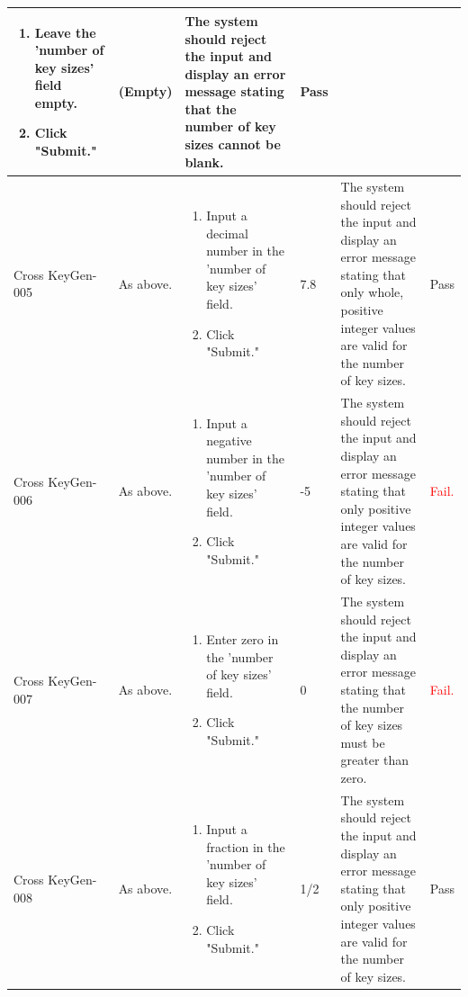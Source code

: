 \documentclass[]{final_report}
\theoremstyle{definition}
\begin{document}
\begin{longtable}{|l|p{2.5cm}|p{2.5cm}|p{2.5cm}|p{2.5cm}|p{3cm}|}
\begin{enumerate}
  \item Leave the 'number of key sizes' field empty.
  \item Click "Submit."
  \end{enumerate} & (Empty) & The system should reject the input and display an error message stating that the number of key sizes cannot be blank. & Pass \\
  \hline
   Cross
   KeyGen-005 & As above. & 
  \begin{enumerate}
  \item Input a decimal number in the 'number of key sizes' field.
  \item Click "Submit."
  \end{enumerate} & 7.8 & The system should reject the input and display an error message stating that only whole, positive integer values are valid for the number of key sizes. & Pass \\
  \hline
     Cross
     KeyGen-006 & As above. & 
  \begin{enumerate}
  \item Input a negative number in the 'number of key sizes' field.
  \item Click "Submit."
  \end{enumerate} & -5 & The system should reject the input and display an error message stating that only positive integer values are valid for the number of key sizes. & \textcolor{red}{Fail.} \\
  \hline
    Cross
    KeyGen-007 & As above. & 
  \begin{enumerate}
  \item Enter zero in the 'number of key sizes' field.
  \item Click "Submit."
  \end{enumerate} & 0 & The system should reject the input and display an error message stating that the number of key sizes must be greater than zero. & \textcolor{red}{Fail.} \\
  \hline
    Cross
    KeyGen-008 & As above. & 
  \begin{enumerate}
  \item Input a fraction in the 'number of key sizes' field.
  \item Click "Submit."
  \end{enumerate} & 1/2 & The system should reject the input and display an error message stating that only positive integer values are valid for the number of key sizes. & Pass \\
  \hline
\end{longtable}
\end{document}
